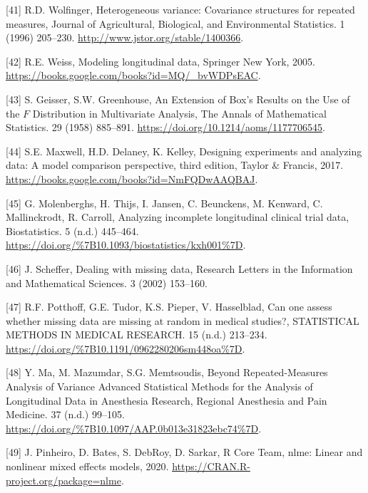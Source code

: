 \documentclass[
]{article}
\begin{document}
\leavevmode\hypertarget{ref-wolfinger1996}{}%
{[}41{]} R.D. Wolfinger, Heterogeneous variance: Covariance structures for repeated measures, Journal of Agricultural, Biological, and Environmental Statistics. 1 (1996) 205--230. \url{http://www.jstor.org/stable/1400366}.

\leavevmode\hypertarget{ref-weiss2005}{}%
{[}42{]} R.E. Weiss, Modeling longitudinal data, Springer New York, 2005. \url{https://books.google.com/books?id=MQ/_bvWDPsEAC}.

\leavevmode\hypertarget{ref-geisser1958}{}%
{[}43{]} S. Geisser, S.W. Greenhouse, An Extension of Box's Results on the Use of the \(F\) Distribution in Multivariate Analysis, The Annals of Mathematical Statistics. 29 (1958) 885--891. \url{https://doi.org/10.1214/aoms/1177706545}.

\leavevmode\hypertarget{ref-maxwell2017}{}%
{[}44{]} S.E. Maxwell, H.D. Delaney, K. Kelley, Designing experiments and analyzing data: A model comparison perspective, third edition, Taylor \& Francis, 2017. \url{https://books.google.com/books?id=NmFQDwAAQBAJ}.

\leavevmode\hypertarget{ref-molenberghs2004}{}%
{[}45{]} G. Molenberghs, H. Thijs, I. Jansen, C. Beunckens, M. Kenward, C. Mallinckrodt, R. Carroll, Analyzing incomplete longitudinal clinical trial data, Biostatistics. 5 (n.d.) 445--464. \url{https://doi.org/\%7B10.1093/biostatistics/kxh001\%7D}.

\leavevmode\hypertarget{ref-scheffer2002}{}%
{[}46{]} J. Scheffer, Dealing with missing data, Research Letters in the Information and Mathematical Sciences. 3 (2002) 153--160.

\leavevmode\hypertarget{ref-potthoff2006}{}%
{[}47{]} R.F. Potthoff, G.E. Tudor, K.S. Pieper, V. Hasselblad, Can one assess whether missing data are missing at random in medical studies?, STATISTICAL METHODS IN MEDICAL RESEARCH. 15 (n.d.) 213--234. \url{https://doi.org/\%7B10.1191/0962280206sm448oa\%7D}.

\leavevmode\hypertarget{ref-ma2012}{}%
{[}48{]} Y. Ma, M. Mazumdar, S.G. Memtsoudis, Beyond Repeated-Measures Analysis of Variance Advanced Statistical Methods for the Analysis of Longitudinal Data in Anesthesia Research, Regional Anesthesia and Pain Medicine. 37 (n.d.) 99--105. \url{https://doi.org/\%7B10.1097/AAP.0b013e31823ebc74\%7D}.

\leavevmode\hypertarget{ref-nlme}{}%
{[}49{]} J. Pinheiro, D. Bates, S. DebRoy, D. Sarkar, R Core Team, nlme: Linear and nonlinear mixed effects models, 2020. \url{https://CRAN.R-project.org/package=nlme}.
\end{document}
